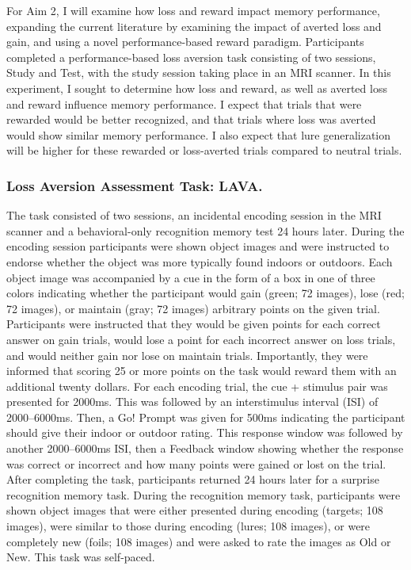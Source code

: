 \documentclass[11pt]{article}
\begin{document}
For Aim 2, I will examine how loss and reward impact memory performance, expanding
the current literature by examining the impact of averted loss and gain, and using a
novel performance-based reward paradigm. Participants completed a performance-based loss
aversion task consisting of two sessions, Study and Test, with the study session taking
place in an MRI scanner. In this experiment, I sought to determine how loss and reward,
as well as averted loss and reward influence memory performance. I expect that trials
that were rewarded would be better recognized, and that trials where loss was averted
would show similar memory performance. I also expect that lure generalization will be
higher for these rewarded or loss-averted trials compared to neutral trials.

\subsubsection*{Loss Aversion Assessment Task: LAVA.}
The task consisted of two sessions, an incidental encoding session in the MRI scanner
and a behavioral-only recognition memory test 24 hours later. During the encoding
session participants were shown object images and were instructed to endorse whether the
object was more typically found indoors or outdoors. Each object image was accompanied
by a cue in the form of a box in one of three colors indicating whether the participant
would gain (green; 72 images), lose (red; 72 images), or maintain (gray; 72 images)
arbitrary points on the given trial. Participants were instructed that they would be
given points for each correct answer on gain trials, would lose a point for each
incorrect answer on loss trials, and would neither gain nor lose on maintain trials.
Importantly, they were informed that scoring 25 or more points on the task would reward
them with an additional twenty dollars. For each encoding trial, the cue + stimulus pair
was presented for 2000ms. This was followed by an interstimulus interval (ISI) of
2000--6000ms. Then, a Go! Prompt was given for 500ms indicating the participant should
give their indoor or outdoor rating. This response window was followed by another
2000--6000ms ISI, then a Feedback window showing whether the response was correct or
incorrect and how many points were gained or lost on the trial. After completing the
task, participants returned 24 hours later for a surprise recognition memory task.
During the recognition memory task, participants were shown object images that were
either presented during encoding (targets; 108 images), were similar to those during
encoding (lures; 108 images), or were completely new (foils; 108 images) and were asked
to rate the images as Old or New. This task was self-paced.
\end{document}
